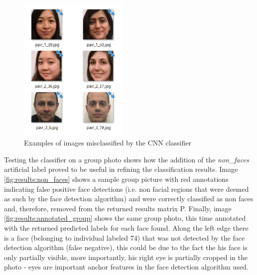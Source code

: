 \documentclass[11pt]{article}
\begin{document}
        \begin{figure}[h]
            \centering
            \includegraphics[height=7cm]{./Images/results/confusion_samples.png}
            \caption{Examples of images misclassified by the CNN classifier}
            \label{fig:results:confusion_samples}
        \end{figure}

        Testing the classifier on a group photo shows how the addition of the \textit{non\_faces} artificial label proved to be useful in refining the classification results. Image \ref{fig:results:non_faces} shows a sample group picture with red annotations indicating false positive face detections (i.e. non facial regions that were deemed as such by the face detection algorithm) and were correctly classified as non faces and, therefore, removed from the returned results matrix P.
        Finally, image \ref{fig:results:annotated_group} shows the same group photo, this time annotated with the returned predicted labels for each face found. Along the left edge there is a face (belonging to individual labeled 74) that was not detected by the face detection algorithm (false negative), this could be due to the fact the his face is only partially visible, more importantly, his right eye is partially cropped in the photo - eyes are important anchor features in the face detection algorithm used.
\end{document}
